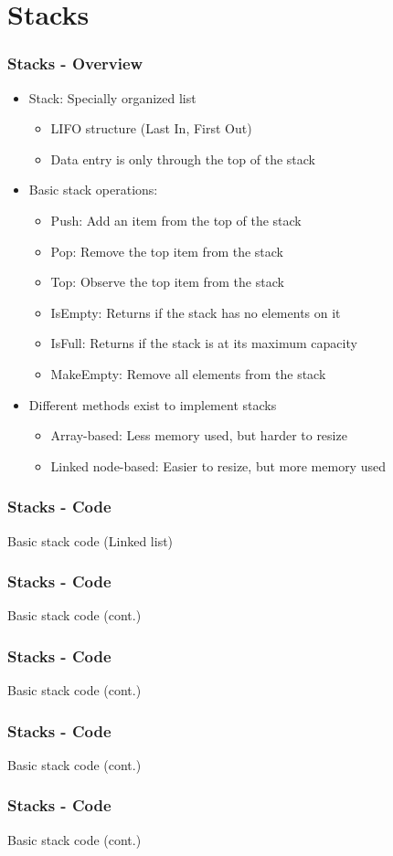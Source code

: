 \section{Stacks}
\begin{frame}\frametitle{Stacks - Overview}
\begin{itemize}
\item Stack: Specially organized list
	\begin{itemize}
	\item LIFO structure (Last In, First Out)
	\item Data entry is only through the top of the stack
	\end{itemize}
\item Basic stack operations:
\begin{itemize}
\item Push: Add an item from the top of the stack
\item Pop: Remove the top item from the stack
\item Top: Observe the top item from the stack
\item IsEmpty: Returns if the stack has no elements on it
\item IsFull: Returns if the stack is at its maximum capacity
\item MakeEmpty: Remove all elements from the stack
\end{itemize}
\item Different methods exist to implement stacks
	\begin{itemize}
	\item Array-based: Less memory used, but harder to resize
	\item Linked node-based: Easier to resize, but more memory used
	\end{itemize}
\end{itemize}
\end{frame}

\begin{frame}\frametitle{Stacks - Code}
Basic stack code (Linked list)

%
\end{frame}

\begin{frame}\frametitle{Stacks - Code}
Basic stack code (cont.)

\end{frame}

\begin{frame}\frametitle{Stacks - Code}
Basic stack code (cont.)

\end{frame}

\begin{frame}\frametitle{Stacks - Code}
Basic stack code (cont.)

\end{frame}

\begin{frame}\frametitle{Stacks - Code}
Basic stack code (cont.)

\end{frame}
